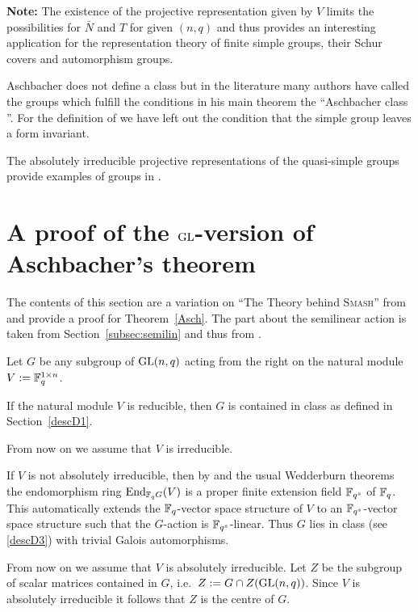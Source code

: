 \textbf{Note:} The existence of the projective representation given by $V$
limits the possibilities for $\bar N$ and $T$ for given $(n,q)$ and thus
provides an interesting application for the representation theory of finite
simple groups, their Schur covers and automorphism groups.

\medskip
{}
Aschbacher does not define a class  but in the literature many
authors have called the groups which fulfill the conditions in
his main theorem the ``Aschbacher class ''.
For the definition of  we have left out the condition that the
simple group leaves a form invariant.

\smallskip
\exmemb
The absolutely irreducible projective representations of the
quasi-simple groups provide examples of groups in .


\section{A proof of the $\mathbf{\GL}$-version of Aschbacher's theorem}
\label{AschProof}

The contents of this section are a variation on ``The Theory behind
\textsc{Smash}'' from \cite[Section~2]{smashnormal} and provide a proof for
Theorem~\ref{Asch}. The part about the semilinear action is taken
from Section~\ref{subsec:semilin} and thus from 
\cite[Section~6.4]{subfieldpaper}.

Let $G$ be any subgroup of $\GL(n,q)$ acting from the right on the
natural module $V := \mathbb{F}_q^{1 \times n}$.

If the natural module $V$ is reducible, then $G$ is contained in class 
as defined in Section~\ref{descD1}.

From now on we assume that $V$ is irreducible.

If $V$ is not absolutely irreducible, then by \cite[(29.13)]{CR0} and the 
usual Wedderburn theorems
the endomorphism ring $\End_{\F_q G}(V)$ is a proper finite extension field
$\mathbb{F}_{q^s}$ of $\mathbb{F}_q$. This automatically extends the $\mathbb{F}_q$-vector
space structure of $V$ to an $\mathbb{F}_{q^s}$-vector space structure
such that the $G$-action is $\mathbb{F}_{q^s}$-linear. Thus $G$ lies in class
 (see \ref{descD3}) with trivial Galois automorphisms.

From now on we assume that $V$ is absolutely irreducible. Let $Z$ be the
subgroup of scalar matrices contained in $G$, i.e.~$Z := G \cap
Z(\GL(n,q))$. Since $V$ is absolutely irreducible it follows that $Z$ is
the centre of $G$.

